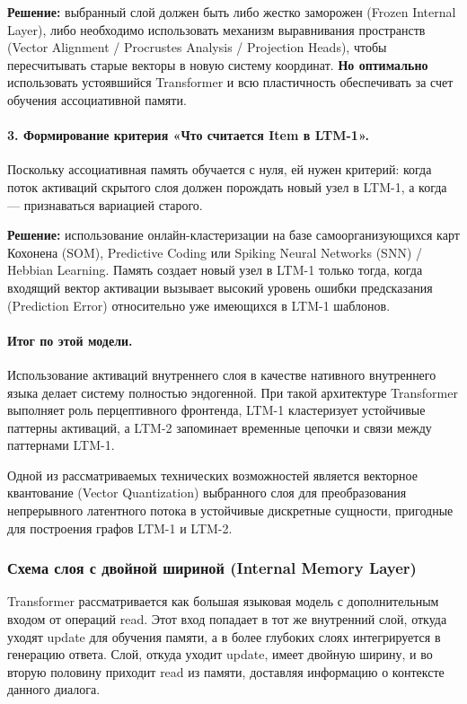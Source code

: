 \documentclass[11pt,a4paper]{article}
\begin{document}
\textbf{Решение:} выбранный слой должен быть либо жестко заморожен (Frozen Internal Layer), либо необходимо использовать механизм выравнивания пространств (Vector Alignment / Procrustes Analysis / Projection Heads), чтобы пересчитывать старые векторы в новую систему координат. \textbf{Но оптимально} использовать устоявшийся Transformer и всю пластичность обеспечивать за счет обучения ассоциативной памяти.

\paragraph{3. Формирование критерия «Что считается Item в LTM-1».}
Поскольку ассоциативная память обучается с нуля, ей нужен критерий: когда поток активаций скрытого слоя должен порождать новый узел в LTM-1, а когда — признаваться вариацией старого.

\textbf{Решение:} использование онлайн-кластеризации на базе самоорганизующихся карт Кохонена (SOM), Predictive Coding или Spiking Neural Networks (SNN) / Hebbian Learning. Память создает новый узел в LTM-1 только тогда, когда входящий вектор активации вызывает высокий уровень ошибки предсказания (Prediction Error) относительно уже имеющихся в LTM-1 шаблонов.

\paragraph{Итог по этой модели.}
Использование активаций внутреннего слоя в качестве нативного внутреннего языка делает систему полностью эндогенной. При такой архитектуре Transformer выполняет роль перцептивного фронтенда, LTM-1 кластеризует устойчивые паттерны активаций, а LTM-2 запоминает временные цепочки и связи между паттернами LTM-1.

Одной из рассматриваемых технических возможностей является векторное квантование (Vector Quantization) выбранного слоя для преобразования непрерывного латентного потока в устойчивые дискретные сущности, пригодные для построения графов LTM-1 и LTM-2.

\subsubsection*{Схема слоя с двойной шириной (Internal Memory Layer)}

Transformer рассматривается как большая языковая модель с дополнительным входом от операций read. Этот вход попадает в тот же внутренний слой, откуда уходят update для обучения памяти, а в более глубоких слоях интегрируется в генерацию ответа. Слой, откуда уходит update, имеет двойную ширину, и во вторую половину приходит read из памяти, доставляя информацию о контексте данного диалога.
\end{document}
